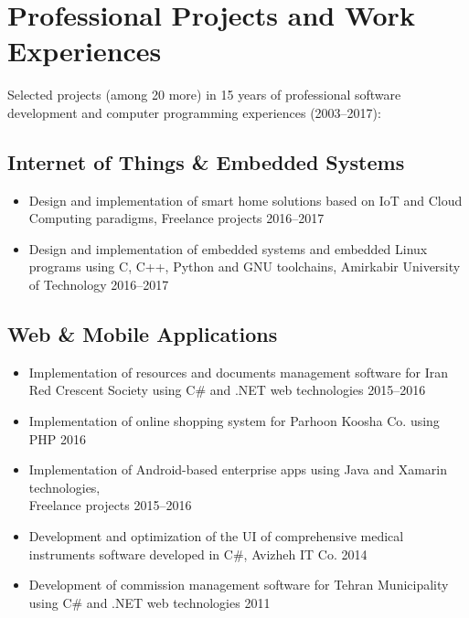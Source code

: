 \documentclass{cv}
\begin{document}

\section{Professional Projects and Work Experiences}


Selected projects (among 20 more) in 15 years of professional software development and computer programming experiences (2003--2017):

\subsection{Internet of Things \& Embedded Systems}

\begin{itemize}

\item
Design and implementation of smart home solutions based on IoT and Cloud Computing paradigms, Freelance projects \hfill 2016--2017
\item
Design and implementation of embedded systems and embedded Linux programs using C, C++, Python and GNU toolchains, Amirkabir University of Technology \hfill 2016--2017

\end{itemize}


\subsection{Web \& Mobile Applications}

\begin{itemize}

\item
Implementation of resources and documents management software for Iran Red Crescent Society using C\# and .NET web technologies \hfill 2015--2016
\item
Implementation of online shopping system for Parhoon Koosha Co. using PHP \hfill 2016
\item
Implementation of Android-based enterprise apps using Java and Xamarin technologies, \\Freelance projects \hfill 2015--2016
\item
Development and optimization of the UI of comprehensive medical instruments software developed in C\#, Avizheh IT Co. \hfill 2014
\item
Development of commission management software for Tehran Municipality using C\# and .NET web technologies \hfill 2011

\end{itemize}
\end{document}
